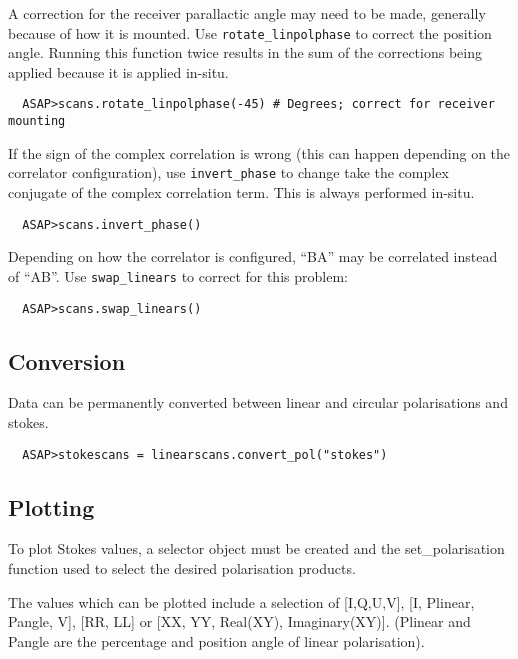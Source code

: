 \documentclass[11pt]{article}
\newcommand{\cmd}[1]{{\tt #1}}
\begin{document}
A correction for the receiver parallactic angle may need to be made,
generally because of how it is mounted. Use \cmd{rotate\_linpolphase}
to correct the position angle. Running this function twice results in
the sum of the corrections being applied because it is applied
in-situ.

\begin{verbatim}
  ASAP>scans.rotate_linpolphase(-45) # Degrees; correct for receiver mounting
\end{verbatim}

If the sign of the complex correlation is wrong (this can happen
depending on the correlator configuration), use \cmd{invert\_phase} to
change take the complex conjugate of the complex correlation
term. This is always performed in-situ.

\begin{verbatim}
  ASAP>scans.invert_phase()
\end{verbatim}

Depending on how the correlator is configured, ``BA'' may be
correlated instead of ``AB''. Use \cmd{swap\_linears} to correct for
this problem:

\begin{verbatim}
  ASAP>scans.swap_linears()
\end{verbatim}

\subsection{Conversion}
\label{sec:polconv}

Data can be permanently converted between linear and circular
polarisations and stokes.

\begin{verbatim}
  ASAP>stokescans = linearscans.convert_pol("stokes")
\end{verbatim}


\subsection{Plotting}
\label{sec:polplot}

To plot Stokes values, a selector object
must be created and the set\_polarisation function used to select the
desired polarisation products.

The values which can be plotted include a selection of [I,Q,U,V], [I,
Plinear, Pangle, V], [RR, LL] or [XX, YY, Real(XY),
Imaginary(XY)]. (Plinear and Pangle are the percentage and position
angle of linear polarisation).
\end{document}
